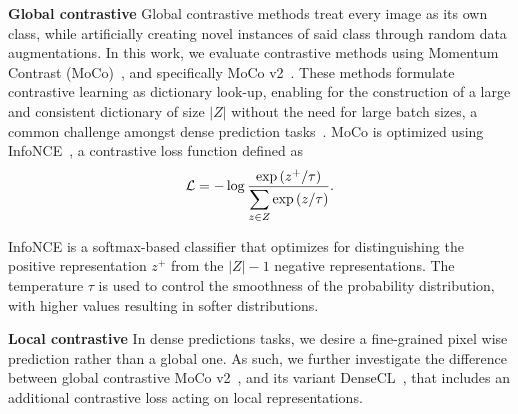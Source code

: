 \documentclass[10pt,twocolumn,letterpaper]{article}
\newcommand{\parsection}[1]{\vspace{1mm}\noindent\textbf{#1 }}
\begin{document}
\parsection{Global contrastive}
Global contrastive methods treat every image as its own class, while artificially creating novel instances of said class through random data augmentations. 
In this work, we evaluate contrastive methods using Momentum Contrast (MoCo)~\cite{he2020momentum}, and specifically MoCo v2~\cite{chen2020improved}. 
These methods formulate contrastive learning as dictionary look-up, enabling for the construction of a large and consistent dictionary of size $|Z|$ without the need for large batch sizes, a common challenge amongst dense prediction tasks~\cite{chen2018encoder}. 
MoCo is optimized using InfoNCE~\cite{oord2018representation}, a contrastive loss function defined as
\vspace{-0.05in}
\begin{equation}
\vspace{-0.05in}
\mathcal{L} = -\log \dfrac{\exp{(z^+/\tau)}}{\displaystyle\sum_{z\in Z} \exp{(z/\tau)}
}.
\end{equation}

\noindent
InfoNCE is a softmax-based classifier that optimizes for distinguishing the positive representation $z^+$ from the $|Z|-1$ negative representations. 
The temperature $\tau$ is used to control the smoothness of the probability distribution, with higher values resulting in softer distributions. 

\parsection{Local contrastive}
In dense predictions tasks, we desire a fine-grained pixel wise prediction rather than a global one. 
As such, we further investigate the difference between global contrastive MoCo v2~\cite{chen2020improved}, and its variant DenseCL~\cite{wang2020dense}, that includes an additional contrastive loss acting on local representations.
\end{document}
